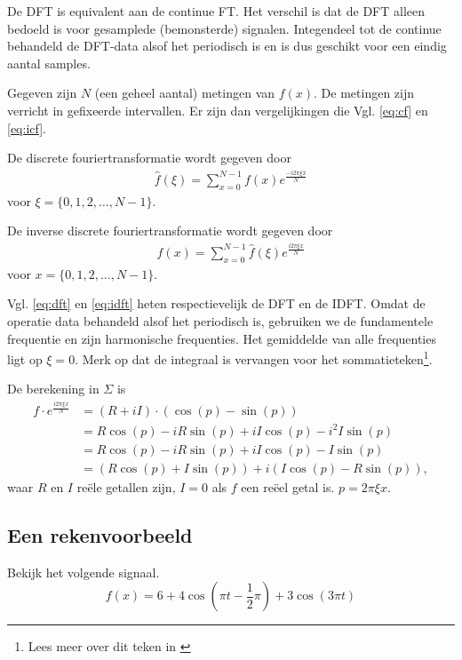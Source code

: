 \documentclass[11pt,fleqn]{book} %
\begin{document}
De DFT is equivalent aan de continue FT. Het verschil is dat de DFT alleen bedoeld is voor gesamplede (bemonsterde) signalen. Integendeel tot de continue behandeld de DFT-data alsof het periodisch is en is dus geschikt voor een eindig aantal samples.

Gegeven zijn $N$ (een geheel aantal) metingen van $f(x)$. De metingen zijn verricht in gefixeerde intervallen. Er zijn dan vergelijkingen die Vgl. \ref{eq:cf} en \ref{eq:icf}.
\begin{definition} \label{eq:dft}
De discrete fouriertransformatie wordt gegeven door
\begin{align}
\hat{f}(\xi)=\sum_{x=0}^{N-1} f(x)e^{\frac{-i2\pi \xi x}{N}}
\end{align}
voor $\xi=\{0, 1, 2, \ldots, N-1\}$.
\end{definition}
\begin{definition} \label{eq:idft}
De inverse discrete fouriertransformatie wordt gegeven door
\begin{align}
f(x)=\sum_{x=0}^{N-1} \hat{f}(\xi)e^{\frac{i2\pi \xi x}{N}}
\end{align}
voor $x=\{0, 1, 2, \ldots, N-1\}$.
\end{definition}


Vgl. \ref{eq:dft} en \ref{eq:idft} heten respectievelijk de DFT en de IDFT. Omdat de operatie data behandeld alsof het periodisch is, gebruiken we de fundamentele frequentie en zijn harmonische frequenties. Het gemiddelde van alle frequenties ligt op $\xi=0$. Merk op dat de integraal is vervangen voor het sommatieteken\footnote{Lees meer over dit teken in \cite{som}}.

De berekening in $\Sigma$ is
\begin{displaymath}
\begin{aligned}
f\cdot e^{\frac{i2\pi \xi x}{N}}&=(R+iI)\cdot(\cos{(p)}-\sin{(p)})\\
& = R\cos{(p)}-iR\sin{(p)}+iI\cos{(p)}-i^2I\sin{(p)}\\
& =R\cos{(p)}-iR\sin{(p)}+iI\cos{(p)}-I\sin{(p)}\\
& =(R\cos{(p)}+I\sin{(p)})+i(I\cos{(p)}-R\sin{(p)}),
\end{aligned}
\end{displaymath}
waar $R$ en $I$ reële getallen zijn, $I=0$ als $f$ een reëel getal is. $p=2\pi\xi x$.

\subsection{Een rekenvoorbeeld}
Bekijk het volgende signaal.
\begin{equation*}
f(x)=6+4\cos{\left(\pi t - \frac{1}{2}\pi\right)}+3\cos{\left(3\pi t\right)}
\end{equation*}
\end{document}
